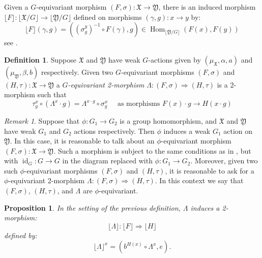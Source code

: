 \documentclass[12pt, final]{amsart}
\theoremstyle{remark}
\newtheorem{remark}[example]{Remark}
\theoremstyle{definition}
\newtheorem{definition}[example]{Definition}
\theoremstyle{plain}
\newtheorem{proposition}[example]{Proposition}
\newcommand{\fX}{{\mathfrak X}}
\newcommand{\fY}{{\mathfrak Y}}
\DeclareMathOperator{\id}{id}
\DeclareMathOperator{\Hom}{Hom}
\begin{document}
Given a $G$-equivariant morphism $(F,\sigma):\fX\to\fY$, there is an induced morphism 
$\lfloor F\rfloor :\lfloor \fX/G\rfloor \to \lfloor \fY/G\rfloor $ defined on morphisms
$(\gamma,g):x \to y$ by: 
$$
\lfloor F \rfloor (\gamma,g) =  ((\sigma_{g}^{y})^{-1}\circ F(\gamma), g) \in \Hom_{\lfloor \fY/G\rfloor}(F(x),F(y))
$$
see \cite[page 14]{ginot}.

\begin{definition}\label{d:equivariant2}
    Suppose $\fX$ and $\fY$ have weak $G$-actions given by $(\mu_\fX,\alpha, a)$ 
    and $(\mu_\fY,\beta, b)$ respectively. Given two $G$-equivariant morphisms 
    $(F,\sigma)$ and $(H,\tau): \fX \to \fY$ a \emph{$G$-equivariant 2-morphism }
    $\Lambda : (F,\sigma)\Rightarrow (H,\tau)$ is a 2-morphism such that 
    $$
    \tau^{x}_{g}\circ(\Lambda^{x}\cdot g) = \Lambda^{x\cdot g}\circ \sigma^{x}_{g} \quad \text{ as morphisms } F(x)\cdot g \to H(x\cdot g)  
    $$
\end{definition}

\begin{remark}
    Suppose that $\phi:G_1 \to G_2$ is a group homomorphism, and $\fX$ and $\fY$
    have weak $G_1$ and $G_2$ actions respectively. Then $\phi$ induces 
    a weak $G_1$ action on $\fY$. In this case, it is reasonable to talk about 
    an $\phi$-equivariant morphism $(F,\sigma):\fX \to \fY$. Such a morphism is subject to the 
    same conditions as in , but with $\id_G: G \to G$ in the 
    diagram replaced with $\phi:G_1 \to G_2$. Moreover, given two such 
    $\phi$-equivariant morphisms $(F,\sigma)$ and $(H,\tau)$, it is 
    reasonable to ask for a $\phi$-equivariant 2-morphism $\Lambda:(F,\sigma) \Rightarrow (H,\tau)$.
    In this context we say that $(F,\sigma)$, $(H,\tau)$, and $\Lambda$ are 
    $\phi$-equivariant.
\end{remark}

\begin{proposition}
    \label{p:natExists}
    In the setting of the previous definition, $\Lambda$ induces a 2-morphism:
    $$
    \lfloor \Lambda\rfloor : \lfloor F\rfloor \Rightarrow \lfloor H\rfloor
    $$
    defined by:
    $$
    \lfloor \Lambda \rfloor^{x} = (b^{H(x)}\circ\Lambda^{x},e). 
    $$  
\end{proposition}
\end{document}
